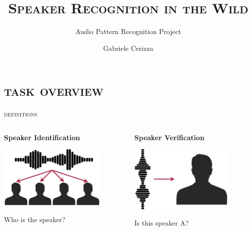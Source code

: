 \documentclass[10pt,aspectratio=1610,professionalfont]{beamer}
\title{\textsc{Speaker Recognition in the Wild}}
\subtitle{Audio Pattern Recognition Project}
\author{Gabriele Cerizza}
\date{}
\institute{\textit{Università degli Studi di Milano}}
\begin{document}
\maketitle


\section{\textsc{task overview}}

\begin{frame}{\textsc{definitions}}
    	\begin{columns}
		\begin{column}{0.5\textwidth}
			\center
			\textbf{\huge{Speaker Identification}}
			\vspace{5mm}
		   	\begin{center}
		     	\includegraphics[width=0.8\textwidth]{img/speaker_identification.png}
		    	\end{center}
			\vspace{2mm}
			\Large{Who is the speaker?}
		\end{column}
		\begin{column}{0.5\textwidth}  %
			\center
			\textbf{\huge{Speaker Verification}}
			\vspace{5mm}
		   	\begin{center}
		     	\includegraphics[width=0.8\textwidth]{img/speaker_verification.png}
		    	\end{center}
			\vspace{2mm}
			\Large{Is this speaker A?}
		\end{column}
	\end{columns}
\end{frame}
\end{document}
